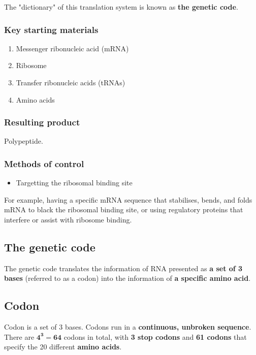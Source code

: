 \documentclass[11pt]{article}
\begin{document}
The "dictionary" of this translation system is known as \textbf{the genetic code}.

\subsubsection{Key starting materials}
\label{sec:org7887c78}
\begin{enumerate}
\item Messenger ribonucleic acid (mRNA)
\item Ribosome
\item Transfer ribonucleic acids (tRNAs)
\item Amino acids
\end{enumerate}

\subsubsection{Resulting product}
\label{sec:orgf8f958a}
Polypeptide.

\subsubsection{Methods of control}
\label{sec:orgc066e14}
\begin{itemize}
\item Targetting the ribosomal binding site
\end{itemize}

For example, having a specific mRNA sequence that stabilises, bends, and folds mRNA to black the ribosomal binding site, or using regulatory proteins that interfere or assist with ribosome binding.

\subsection{The genetic code}
\label{sec:org459acdf}
The genetic code translates the information of RNA presented as \textbf{a set of 3 bases} (referred to as a codon) into the information of \textbf{a specific amino acid}.

\subsection{Codon}
\label{sec:orgff1803d}
Codon is a set of 3 bases. Codons run in a \textbf{continuous, unbroken sequence}. There are \(\boldsymbol{4^3 = 64}\) codons in total, with \textbf{3 stop codons} and \textbf{61 codons} that specify the 20 different \textbf{amino acids}.
\end{document}
